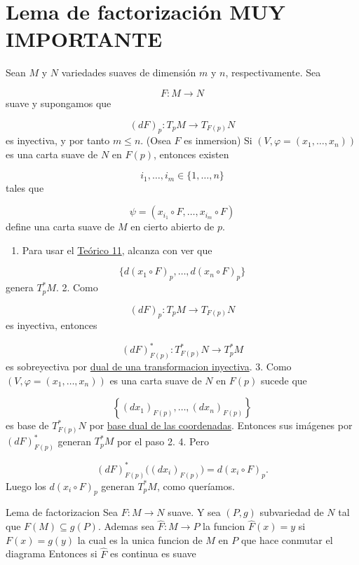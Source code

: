 \section{Lema de factorización MUY IMPORTANTE}
\begin{bookcorollary}{}
Sean $M$ y $N$ variedades suaves de dimensión $m$ y $n$, respectivamente. Sea

\[
F:M\to N
\]
suave y supongamos que

\[
(dF)_p:T_pM\to T_{F(p)}N
\]
es inyectiva, y por tanto $m\le n$. (Osea $F$ es inmersion) Si $(V,\varphi=(x_1,\ldots,x_n))$ es una carta suave de $N$ en $F(p)$, entonces existen

\[
i_1,\ldots,i_m\in\{1,\ldots,n\}
\]
tales que

\[
\psi=(x_{i_1}\circ F,\ldots,x_{i_m}\circ F)
\]
define una carta suave de $M$ en cierto abierto de $p$.

\end{bookcorollary}
\begin{bookproof}{}
\begin{enumerate}
\item Para usar el \hyperref[blk:49431b]{Teórico 11}, alcanza con ver que
\end{enumerate}
\[
\{d(x_1\circ F)_p,\ldots,d(x_n\circ F)_p\}
\]
genera $T_p^\ast M$. 2. Como

\[
(dF)_p:T_pM\to T_{F(p)}N
\]
es inyectiva, entonces

\[
(dF)^\ast_{F(p)}:T_{F(p)}^\ast N\to T_p^\ast M
\]
es sobreyectiva por \hyperref[blk:dual-inyectiva-sobreyectiva]{dual de una transformacion inyectiva}. 3. Como $(V,\varphi=(x_1,\ldots,x_n))$ es una carta suave de $N$ en $F(p)$ sucede que

\[
\left\{(dx_1)_{F(p)},\ldots,(dx_n)_{F(p)}\right\}
\]
es base de $T_{F(p)}^\ast N$ por \hyperref[blk:base-dual-coordenadas]{base dual de las coordenadas}. Entonces sus imágenes por $(dF)^\ast_{F(p)}$ generan $T_p^\ast M$ por el paso 2. 4. Pero

\[
(dF)^\ast_{F(p)}\big((dx_i)_{F(p)}\big)=d(x_i\circ F)_p.
\]
Luego los $d(x_i\circ F)_p$ generan $T_p^\ast M$, como queríamos.

\bookqed
\end{bookproof}
\begin{bookproposition}{Lema de factorizacion}
Sea $F:M\rightarrow N$ suave. Y sea $(P,g)$ subvariedad de $N$ tal que $F(M)\subseteq g(P)$. Ademas sea $\widehat{F}:M\rightarrow P$ la funcion $\widehat{F}(x)=y$ si $F(x)=g(y)$ la cual es la unica funcion de $M$ en $P$ que hace conmutar el diagrama 
 Entonces si $\widehat{F}$ es continua es suave

\end{bookproposition}
